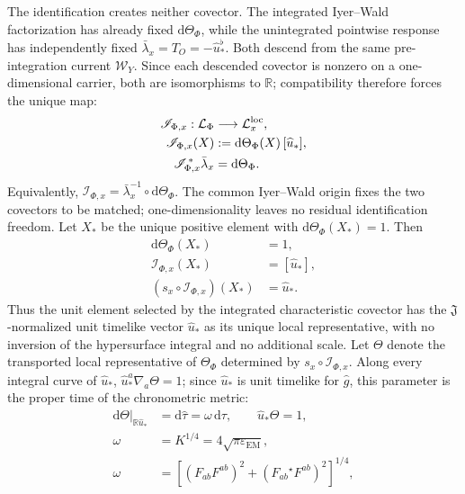 \documentclass[aps,prl,reprint]{revtex4-2}
\newcommand{\EM}{\mathrm{EM}}
\newcommand{\dd}{\mathrm d}
\begin{document}
The identification creates neither covector. The integrated Iyer--Wald factorization has already fixed $\dd\Theta_\Phi$, while the unintegrated pointwise response has independently fixed $\bar\lambda_x=T_O=-\widehat u_*^\flat$. Both descend from the same pre-integration current $\mathcal W_Y$. Since each descended covector is nonzero on a one-dimensional carrier, both are isomorphisms to $\mathbb R$; compatibility therefore forces the unique map:
\begin{equation}
\begin{aligned}
\mathscr I_{\Phi,x}:
\mathcal L_\Phi
&\longrightarrow
\mathcal L_x^{\rm loc},\\
\mathscr I_{\Phi,x}(X)
&:=
\dd\Theta_\Phi(X)\,[\widehat u_*],\\
\mathscr I_{\Phi,x}^{\,*}\bar\lambda_x
&=\dd\Theta_\Phi .
\end{aligned}
\label{eq:clockiso}
\end{equation}
Equivalently, $\mathscr I_{\Phi,x}=\bar\lambda_x^{-1}\circ\dd\Theta_\Phi$. The common Iyer--Wald origin fixes the two covectors to be matched; one-dimensionality leaves no residual identification freedom. Let $X_*$ be the unique positive element with $\dd\Theta_\Phi(X_*)=1$. Then
\begin{equation}
\begin{aligned}
\dd\Theta_\Phi(X_*)&=1,\\
\mathscr I_{\Phi,x}(X_*)&=[\widehat u_*],\\
(s_x\circ\mathscr I_{\Phi,x})(X_*)&=\widehat u_* .
\end{aligned}
\label{eq:normalizationbridge}
\end{equation}
Thus the unit element selected by the integrated characteristic covector has the $\mathfrak J$-normalized unit timelike vector $\widehat u_*$ as its unique local representative, with no inversion of the hypersurface integral and no additional scale. Let $\Theta$ denote the transported local representative of $\Theta_\Phi$ determined by $s_x\circ\mathscr I_{\Phi,x}$. Along every integral curve of $\widehat u_*$, $\widehat u_*^a\nabla_a\Theta=1$; since $\widehat u_*$ is unit timelike for $\widehat g$, this parameter is the proper time of the chronometric metric:
\begin{equation}
\begin{aligned}
\left.\dd\Theta\right|_{\mathbb R\widehat u_*}
&=\dd\widehat\tau=\omega\,\dd\tau,
\qquad\widehat u_*\Theta=1,\\
\omega&=K^{1/4}=4\sqrt{\pi\varepsilon_{\EM}},\\
\omega&=\left[(F_{ab}F^{ab})^2+
(F_{ab}{}^\star F^{ab})^2\right]^{1/4},
\end{aligned}
\label{eq:clock}
\end{equation}
\end{document}
